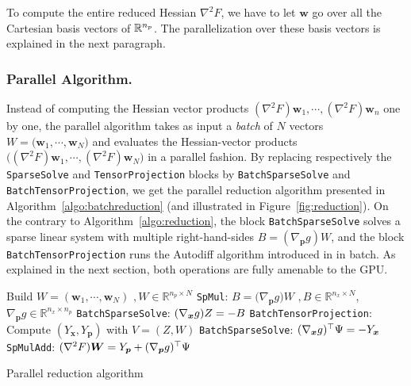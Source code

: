 To compute the entire reduced
Hessian $\nabla^2 F$, we have to let $\bm{w}$ go over all the Cartesian basis vectors of $\REAL^{n_p}$.
The parallelization over these basis vectors is explained in the next paragraph.

\subsubsection{Parallel Algorithm.}
Instead of computing the Hessian vector products $(\nabla^2 F)\bm{w}_1,\cdots, (\nabla^2 F)\bm{w}_n$
one by one, the parallel algorithm takes as input a \emph{batch} of $N$ vectors $W = \big(\bm{w}_1, \cdots,
\bm{w}_N\big)$ and evaluates the Hessian-vector products
$\big((\nabla^2 F)\bm{w}_1, \cdots, (\nabla^2 F)\bm{w}_N\big)$ in a parallel fashion.
By replacing respectively the {\tt SparseSolve} and {\tt TensorProjection} blocks by
{\tt BatchSparseSolve} and {\tt BatchTensorProjection},  we get the
parallel reduction algorithm presented in Algorithm~\ref{algo:batchreduction}
(and illustrated in Figure~\ref{fig:reduction}).
On the contrary to Algorithm~\ref{algo:reduction}, the block
{\tt BatchSparseSolve} solves a sparse linear system with multiple right-hand-sides
$B = (\nabla_{\bm{p}}g) W$, and the block {\tt BatchTensorProjection} runs the Autodiff
algorithm introduced in  in batch.
As explained in the next section,
both operations are fully amenable to the GPU.
\begin{algorithm2e}
  Build $W = (\bm{w}_1, \cdots, \bm{w}_N)$ $, W \in \mathbb{R}^{n_p \times N}$  \;
  {\tt SpMul}: $B = \big(\nabla_{\bm{p}}g  \big) W$ $, B \in \mathbb{R}^{n_x \times N}$, $\nabla_{\bm{p}}g \in \mathbb{R}^{n_x \times n_p}$\;
  {\tt BatchSparseSolve}: $(\grad{g}{\bm{x}}) Z = - B$ \;
  {\tt BatchTensorProjection}: Compute $(Y_{\bm{x}}, Y_{\bm{p}})$ with $V = (Z, W)$ \;
  {\tt BatchSparseSolve}: $(\grad{g}{\bm{x}})^\top \Psi = - Y_{\bm{x}}$ \;
  {\tt SpMulAdd}: $(\nabla^2 F)\bm{W} = Y_{\bm{p}} + (\grad{g}{\bm{p}})^\top\Psi$ \;
 \caption{Parallel reduction algorithm}
 \label{algo:batchreduction}
\end{algorithm2e}

